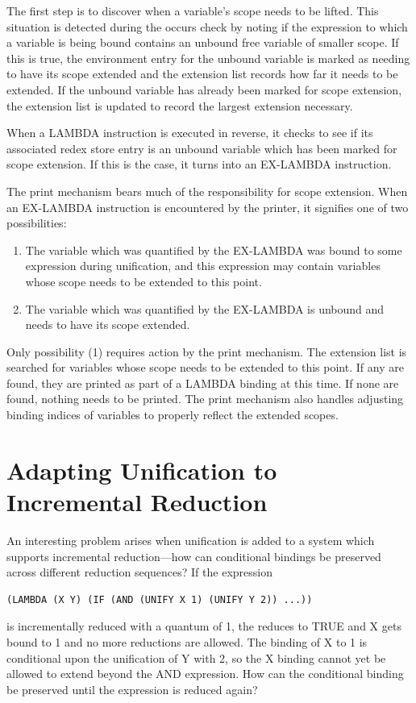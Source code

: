 The first step is to discover when a variable's scope needs to be lifted. This
situation is detected during the occurs check by noting if the expression to
which a variable is being bound contains an unbound free variable of smaller
scope. If this is true, the environment entry for the unbound variable is marked
as needing to have its scope extended and the extension list records how far it
needs to be extended. If the unbound variable has already been marked for scope
extension, the extension list is updated to record the largest extension
necessary.

When a LAMBDA instruction is executed in reverse, it checks to see if its
associated redex store entry is an unbound variable which has been marked for
scope extension. If this is the case, it turns into an EX-LAMBDA instruction.

The print mechanism bears much of the responsibility for scope extension. When
an EX-LAMBDA instruction is encountered by the printer, it signifies one of two
possibilities:

\begin{enumerate}
\item The variable which was quantified by the EX-LAMBDA was bound to some
expression during unification, and this expression may contain variables whose
scope needs to be extended to this point.
\item The variable which was quantified by the EX-LAMBDA is unbound and needs to
have its scope extended.
\end{enumerate}

Only possibility (1) requires action by the print mechanism. The extension list
is searched for variables whose scope needs to be extended to this point. If any
are found, they are printed as part of a LAMBDA binding at this time. If none
are found, nothing needs to be printed. The print mechanism also handles
adjusting binding indices of variables to properly reflect the extended scopes.

\section{Adapting Unification to Incremental Reduction}

An interesting problem arises when unification is added to a system which
supports incremental reduction---how can conditional bindings be preserved
across different reduction sequences? If the expression
\begin{verbatim}
(LAMBDA (X Y) (IF (AND (UNIFY X 1) (UNIFY Y 2)) ...))
\end{verbatim}
is incrementally reduced with a quantum of 1, the  reduces to
TRUE and X gets bound to 1 and no more reductions are allowed. The binding of X
to 1 is conditional upon the unification of Y with 2, so the X binding cannot
yet be allowed to extend beyond the AND expression. How can the conditional
binding be preserved until the expression is reduced again?

